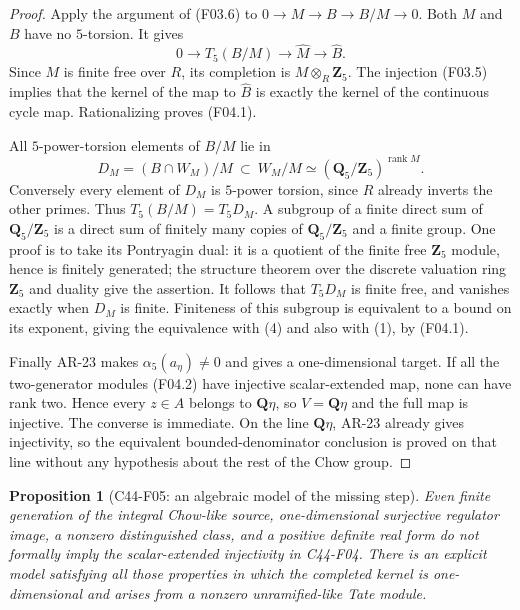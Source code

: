 \documentclass[11pt]{article}
\newtheorem{proposition}[theorem]{Proposition}
\theoremstyle{remark}\newtheorem{remark}[theorem]{Remark}
\begin{document}
\begin{proof}
Apply the argument of (F03.6) to
$0\to M\to B\to B/M\to0$.  Both $M$ and $B$ have no
$5$-torsion.  It gives
\[
 0\longrightarrow T_5(B/M)\longrightarrow\widehat M
                         \longrightarrow\widehat B.
\]
Since $M$ is finite free over $R$, its completion is
$M\otimes_R\mathbf Z_5$.  The injection (F03.5) implies
that the kernel of the map to $\widehat B$ is exactly the
kernel of the continuous cycle map.  Rationalizing proves
(F04.1).

All $5$-power-torsion elements of $B/M$ lie in
\[
 D_M=(B\cap W_M)/M\ \subset\ W_M/M
          \simeq(\mathbf Q_5/\mathbf Z_5)^{\operatorname{rank}M}.
\]
Conversely every element of $D_M$ is $5$-power torsion, since
$R$ already inverts the other primes.  Thus $T_5(B/M)=T_5D_M$.
A subgroup of a finite direct sum of $\mathbf Q_5/\mathbf Z_5$
is a direct sum of finitely many copies of
$\mathbf Q_5/\mathbf Z_5$ and a finite group.  One proof is to
take its Pontryagin dual: it is a quotient of the finite free
$\mathbf Z_5$ module, hence is finitely generated; the structure
theorem over the discrete valuation ring $\mathbf Z_5$ and
duality give the assertion.  It follows that $T_5D_M$ is finite
free, and vanishes exactly when $D_M$ is finite.  Finiteness of
this subgroup is equivalent to a bound on its exponent, giving
the equivalence with (4) and also with (1), by (F04.1).

Finally AR-23 makes $\alpha_5(a_\eta)\ne0$ and gives a
one-dimensional target.  If all the two-generator modules
(F04.2) have injective scalar-extended map, none can have rank
two.  Hence every $z\in A$ belongs to $\mathbf Q\eta$, so
$V=\mathbf Q\eta$ and the full map is injective.  The converse
is immediate.  On the line $\mathbf Q\eta$, AR-23 already gives
injectivity, so the equivalent bounded-denominator conclusion
is proved on that line without any hypothesis about the rest
of the Chow group.
\end{proof}

\begin{proposition}[C44-F05: an algebraic model of the missing step]
\label{C44-F05}
Even finite generation of the integral Chow-like source,
one-dimensional surjective regulator image, a nonzero distinguished
class, and a positive definite real form do not formally imply
the scalar-extended injectivity in C44-F04.  There is an explicit
model satisfying all those properties in which the completed
kernel is one-dimensional and arises from a nonzero unramified-like
Tate module.
\end{proposition}
\end{document}
